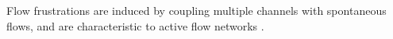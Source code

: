 \documentclass[%
10pt,
superscriptaddress,
twocolumn,
 amsmath,amssymb,
 aps,prx,
]{revtex4-2}
\begin{document}
Flow frustrations are induced by coupling multiple channels with spontaneous flows, and are characteristic to active flow networks \cite{Jorge2024, Beppu2024}.




\end{document}
